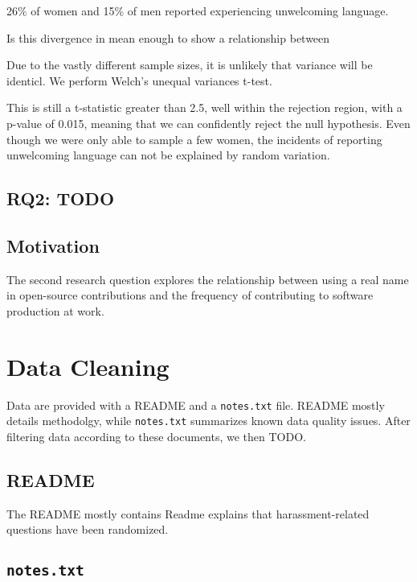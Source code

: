 \documentclass[journal,12pt,onecolumn,]{IEEEtran}
\begin{document}
26\% of women and 15\% of men reported experiencing unwelcoming language.

Is this divergence in mean enough to show a relationship between

Due to the vastly different sample sizes, it is unlikely that variance will be identicl.
We perform Welch's unequal variances t-test.

This is still a t-statistic greater than 2.5, well within the rejection region, with a p-value of 0.015, meaning that we can confidently reject the null hypothesis.
Even though we were only able to sample a few women, the incidents of reporting unwelcoming language can not be explained by random variation.

\begin{figure}
    \centering
    
\end{figure}


\subsection{RQ2: TODO}

\subsection{Motivation}

The second research question explores the relationship between using a real name in open-source contributions and the frequency of contributing to software production at work.

\section{Data Cleaning}

Data are provided with a \textsc{README} and a \texttt{notes.txt} file.
\textsc{README} mostly details methodolgy, while \texttt{notes.txt} summarizes known data quality issues.
After filtering data according to these documents, we then TODO.

\subsection{\textsc{README}}

The \textsc{README} mostly contains Readme explains that harassment-related questions have been randomized.

\subsection{\texttt{notes.txt}}
\end{document}

